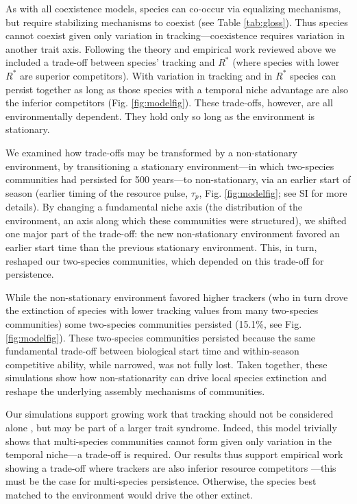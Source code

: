 \documentclass[11pt,letterpaper]{article}
\begin{document}
As with all coexistence models, species can co-occur via equalizing mechanisms, but require stabilizing mechanisms to coexist (see Table \ref{tab:gloss}). Thus species cannot coexist given only variation in tracking---coexistence requires variation in another trait axis. Following the theory and empirical work reviewed above we included a trade-off between species' tracking and $R^*$ (where species with lower $R^*$ are superior competitors). With variation in tracking and in $R^*$ species can persist together as long as those species with a temporal niche advantage are also the inferior competitors (Fig. \ref{fig:modelfig}). These trade-offs, however, are all environmentally dependent. They hold only so long as the environment is stationary. %

We examined how trade-offs may be transformed by a non-stationary environment, by transitioning a stationary environment---in which two-species communities had persisted for 500 years---to non-stationary, via an earlier start of season (earlier timing of the resource pulse, $\tau_p$, Fig. \ref{fig:modelfig}; see SI for more details). By changing a fundamental niche axis (the distribution of the environment, an axis along which these communities were structured), we shifted one major part of the trade-off: the new non-stationary environment favored an earlier start time than the previous stationary environment. This, in turn, reshaped our two-species communities, which depended on this trade-off for persistence. 

While the non-stationary environment favored higher trackers (who in turn drove the extinction of species with lower tracking values from many two-species communities) some two-species communities persisted (15.1\%, see Fig. \ref{fig:modelfig}). These two-species communities persisted because the same fundamental trade-off between biological start time and within-season competitive ability, while narrowed, was not fully lost. Taken together, these simulations show how non-stationarity can drive local species extinction and reshape the underlying assembly mechanisms of communities.

Our simulations support growing work that tracking should not be considered alone \citep{Diamond:2011nx,Dorji2013,Ishioka2013,kharouba2014,du2017}, but may be part of a larger trait syndrome. Indeed, this model trivially shows that multi-species communities cannot form given only variation in the temporal niche---a trade-off is required. Our results thus support empirical work showing a trade-off where trackers are also inferior resource competitors \citep{lasky2016,Zhu2016BioLetters}---this must be the case for multi-species persistence. Otherwise, the species best matched to the environment would drive the other extinct.
\end{document}
